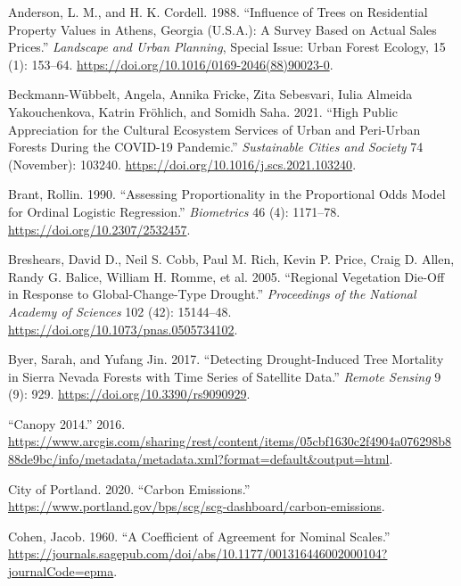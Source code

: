 \documentclass[12pt,twoside]{reedthesis}
\newlength{\cslhangindent}
\newenvironment{CSLReferences}[2] %
 {%
  \setlength{\parindent}{0pt}
  \ifodd #1 \everypar{\setlength{\hangindent}{\cslhangindent}}\ignorespaces\fi
  \ifnum #2 > 0
  \setlength{\parskip}{#2\baselineskip}
  \fi
 }%
 {}
\begin{document}
\hypertarget{refs}{}
\begin{CSLReferences}{1}{0}
\leavevmode{}%
Anderson, L. M., and H. K. Cordell. 1988. {``Influence of Trees on Residential Property Values in Athens, Georgia (U.S.A.): A Survey Based on Actual Sales Prices.''} \emph{Landscape and Urban Planning}, Special Issue: Urban Forest Ecology, 15 (1): 153--64. \url{https://doi.org/10.1016/0169-2046(88)90023-0}.

\leavevmode{}%
Beckmann-Wübbelt, Angela, Annika Fricke, Zita Sebesvari, Iulia Almeida Yakouchenkova, Katrin Fröhlich, and Somidh Saha. 2021. {``High Public Appreciation for the Cultural Ecosystem Services of Urban and Peri{\nobreakdash-}Urban Forests During the COVID-19 Pandemic.''} \emph{Sustainable Cities and Society} 74 (November): 103240. \url{https://doi.org/10.1016/j.scs.2021.103240}.

\leavevmode{}%
Brant, Rollin. 1990. {``Assessing Proportionality in the Proportional Odds Model for Ordinal Logistic Regression.''} \emph{Biometrics} 46 (4): 1171--78. \url{https://doi.org/10.2307/2532457}.

\leavevmode{}%
Breshears, David D., Neil S. Cobb, Paul M. Rich, Kevin P. Price, Craig D. Allen, Randy G. Balice, William H. Romme, et al. 2005. {``Regional Vegetation Die-Off in Response to Global-Change-Type Drought.''} \emph{Proceedings of the National Academy of Sciences} 102 (42): 15144--48. \url{https://doi.org/10.1073/pnas.0505734102}.

\leavevmode{}%
Byer, Sarah, and Yufang Jin. 2017. {``Detecting Drought-Induced Tree Mortality in Sierra Nevada Forests with Time Series of Satellite Data.''} \emph{Remote Sensing} 9 (9): 929. \url{https://doi.org/10.3390/rs9090929}.

\leavevmode{}%
{``Canopy 2014.''} 2016. \url{https://www.arcgis.com/sharing/rest/content/items/05cbf1630c2f4904a076298b888de9bc/info/metadata/metadata.xml?format=default\&output=html}.

\leavevmode{}%
City of Portland. 2020. {``Carbon Emissions.''} \url{https://www.portland.gov/bps/scg/scg-dashboard/carbon-emissions}.

\leavevmode{}%
Cohen, Jacob. 1960. {``A Coefficient of Agreement for Nominal Scales.''} \url{https://journals.sagepub.com/doi/abs/10.1177/001316446002000104?journalCode=epma}.


\end{CSLReferences}
\end{document}
